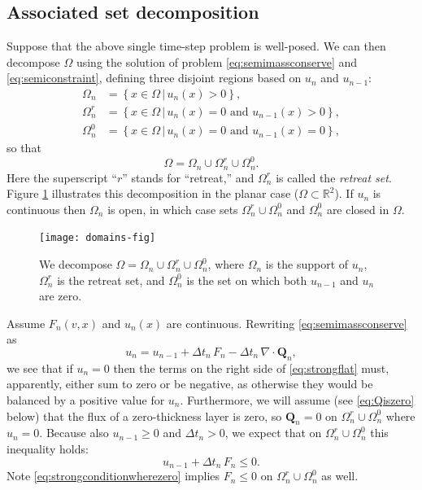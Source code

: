 \documentclass[final,leqno,onefignum,onetabnum]{siamltex1213bueler}
\newcommand\bQ{\mathbf{Q}}
\newcommand{\Div}{\nabla\cdot}
\newcommand\RR{\mathbb{R}}
\begin{document}
\subsection{Associated set decomposition}  \label{subsec:setdecompose}  Suppose that the above single time-step problem is well-posed.  We can then decompose $\Omega$ using the solution of problem \eqref{eq:semimassconserve} and \eqref{eq:semiconstraint}, defining three disjoint regions based on $u_n$ and $u_{n-1}$:
\begin{align*}
\Omega_n &= \left\{x \in \Omega \,\big|\, u_n(x)>0\right\}, \\
\Omega_n^r &= \left\{x \in \Omega \,\big|\, u_n(x)=0 \text{ and } u_{n-1}(x) > 0\right\}, \\
\Omega_n^0 &= \left\{x \in \Omega \,\big|\, u_n(x)=0 \text{ and } u_{n-1}(x) = 0\right\},
\end{align*}
so that
\begin{equation}
\Omega = \Omega_n \cup \Omega_n^r \cup \Omega_n^0.  \label{eq:omegadecomposition}
\end{equation}
Here the superscript ``$r$'' stands for ``retreat,'' and $\Omega_n^r$ is called the \emph{retreat set}.  Figure \ref{fig:domains} illustrates this decomposition in the planar case ($\Omega \subset \RR^2$).  If $u_n$ is continuous then $\Omega_n$ is open, in which case sets $\Omega_n^r \cup \Omega_n^0$ and $\Omega_n^0$ are closed in $\Omega$.

\begin{figure}[ht]
\medskip
\begin{center}
\texttt{[image: domains-fig]}
\end{center}
\caption{We decompose $\Omega = \Omega_n \cup \Omega_n^r \cup \Omega_n^0$, where $\Omega_n$ is the support of $u_n$, $\Omega_n^r$ is the retreat set, and $\Omega_n^0$ is the set on which both $u_{n-1}$ and $u_n$ are zero.}
\label{fig:domains}
\end{figure}

Assume $F_n(v,x)$ and $u_n(x)$ are continuous.  Rewriting \eqref{eq:semimassconserve} as
\begin{equation}
u_n = u_{n-1} + \Delta t_n\, F_n - \Delta t_n\, \Div \bQ_n,  \label{eq:strongflat}
\end{equation}
we see that if $u_n=0$ then the terms on the right side of \eqref{eq:strongflat} must, apparently, either sum to zero or be negative, as otherwise they would be balanced by a positive value for $u_n$.  Furthermore, we will assume (see \eqref{eq:Qiszero} below) that the flux of a zero-thickness layer is zero, so $\bQ_n=0$ on $\Omega_n^r \cup \Omega_n^0$ where $u_n=0$.  Because also $u_{n-1}\ge 0$ and $\Delta t_n > 0$, we expect that on $\Omega_n^r \cup \Omega_n^0$ this inequality holds:
\begin{equation}
u_{n-1} + \Delta t_n\, F_n \le 0. \label{eq:strongconditionwherezero}
\end{equation}
Note \eqref{eq:strongconditionwherezero} implies $F_n \le 0$ on $\Omega_n^r \cup \Omega_n^0$ as well.
\end{document}
